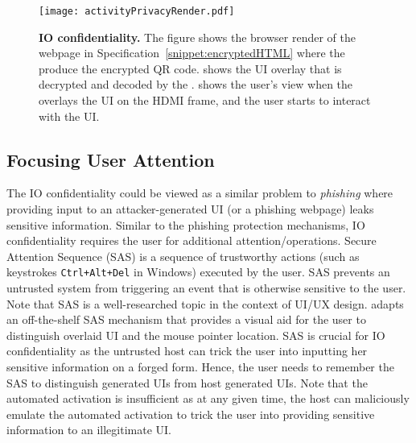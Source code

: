 \begin{figure}[t]
\centering
\texttt{[image: activityPrivacyRender.pdf]}
\caption{\textbf{\name IO confidentiality.} The figure shows \one the browser render of the webpage in Specification~\ref{snippet:encryptedHTML} where the \name \js produce the encrypted QR code. \two shows the UI overlay that is decrypted and decoded by the \device. \three shows the user's view when the \device overlays the UI on the HDMI frame, and the user starts to interact with the UI.}
\spacesave
\label{fig:activityPrivacy}
\centering
\end{figure}

\subsection{Focusing User Attention} 
\label{sec:confidentiality:SAS}

The IO confidentiality could be viewed as a similar problem to \emph{phishing} where providing input to an attacker-generated UI (or a phishing webpage) leaks sensitive information. Similar to the phishing protection mechanisms, IO confidentiality requires the user for additional attention/operations. Secure Attention Sequence (SAS) is a sequence of trustworthy actions (such as keystrokes \texttt{Ctrl+Alt+Del} in Windows) executed by the user. SAS prevents an untrusted system from triggering an event that is otherwise sensitive to the user. Note that SAS is a well-researched topic in the context of UI/UX design. \name adapts an off-the-shelf SAS mechanism that provides a visual aid for the user to distinguish overlaid UI and the mouse pointer location. SAS is crucial for IO confidentiality as the untrusted host can trick the user into inputting her sensitive information on a forged form. Hence, the user needs to remember the SAS to distinguish \device generated UIs from host generated UIs. Note that the automated activation is insufficient as at any given time, the host can maliciously emulate the automated activation to trick the user into providing sensitive information to an illegitimate UI.

